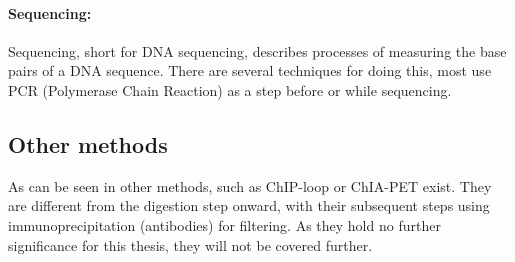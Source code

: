 \paragraph{Sequencing:}\label{sec:sequencing}
Sequencing, short for DNA sequencing, describes processes of measuring the base
pairs of a DNA sequence. There are several techniques for doing this, most use
PCR (Polymerase Chain Reaction) as a step before or while sequencing.







\subsection{Other methods}\label{sec:other3c}

As can be seen in  other methods, such as ChIP-loop or ChIA-PET
exist. They are different from the digestion step onward, with their
subsequent steps using immunoprecipitation (antibodies) for filtering. As they
hold no further significance for this thesis, they will not be covered further.


